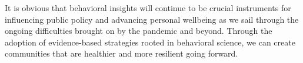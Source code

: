\documentclass[12pt, a4paper]{article}
\begin{document}
It is obvious that behavioral insights will continue to be crucial instruments for influencing public policy and advancing personal wellbeing as we sail through the ongoing difficulties brought on by the pandemic and beyond. Through the adoption of evidence-based strategies rooted in behavioral science, we can create communities that are healthier and more resilient going forward.\\

\break



\end{document}
